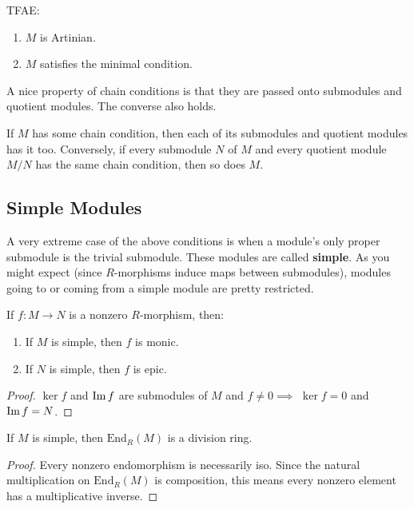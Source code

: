 \documentclass[twoside,10pt]{report}
\begin{document}
\begin{thrm}[]
TFAE:
\begin{enumerate}
	\item $M$ is Artinian.
	\item $M$ satisfies the minimal condition.
\end{enumerate}
\end{thrm}

A nice property of chain conditions is that they are passed onto submodules and quotient modules. The converse also holds.
\begin{prop}
If $M$ has some chain condition, then each of its submodules and quotient modules has it too. Conversely, if every submodule $N$ of $M$ and every quotient module $M/N$ has the same chain condition, then so does $M$.
\end{prop}

\subsection{Simple Modules}

A very extreme case of the above conditions is when a module's only proper submodule is the trivial submodule. These modules are called \textbf{simple}. As you might expect (since $R$-morphisms induce maps between submodules), modules going to or coming from a simple module are pretty restricted.

\begin{prop}
If $f:M\to N$ is a nonzero $R$-morphism, then:
\begin{enumerate}
	\item If $M$ is simple, then $f$ is monic.
	\item If $N$ is simple, then $f$ is epic.
\end{enumerate}
\end{prop}
\begin{proof}
	$\ker f$ and $\operatorname{Im} f$ are submodules of $M$ and $f \neq 0 \implies $ $\ker f=0$ and $\operatorname{Im} f = N$.
\end{proof}

\begin{cor}[Schur]
	If $M$ is simple, then $\text{End}_{R}(M)$ is a division ring.
\end{cor}
\begin{proof}
	Every nonzero endomorphism is necessarily iso. Since the natural multiplication on $\text{End}_{R}(M)$ is composition, this means every nonzero element has a multiplicative inverse.
\end{proof}
\end{document}
